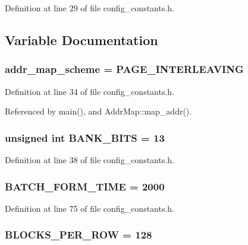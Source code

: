 Definition at line 29 of file config\_\-constants.h.

\subsection{Variable Documentation}
\subsubsection[{addr\_\-map\_\-scheme}]{ {\bf addr\_\-map\_\-scheme} = PAGE\_\-INTERLEAVING}\label{config__constants_8h_d1a6650288eeca57ccc26007fe8b2ebe}




Definition at line 34 of file config\_\-constants.h.

Referenced by main(), and AddrMap::map\_\-addr().
\subsubsection[{BANK\_\-BITS}]{\setlength{\rightskip}{0pt plus 5cm}unsigned int {\bf BANK\_\-BITS} = 13}\label{config__constants_8h_4dead09fbe9da04753765df2d1dc54dd}




Definition at line 38 of file config\_\-constants.h.
\subsubsection[{BATCH\_\-FORM\_\-TIME}]{ {\bf BATCH\_\-FORM\_\-TIME} = 2000}\label{config__constants_8h_243042fd09a1409f876bd7419735069c}




Definition at line 75 of file config\_\-constants.h.
\subsubsection[{BLOCKS\_\-PER\_\-ROW}]{ {\bf BLOCKS\_\-PER\_\-ROW} = 128}\label{config__constants_8h_c15398f7ab1a6741703b039a8292c72b}




